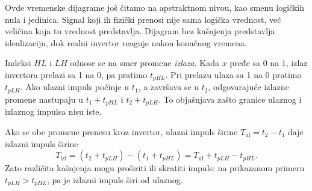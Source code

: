 
Ovde vremenske dijagrame još čitamo na apstraktnom nivou, kao smenu logičkih nula i jedinica. Signal koji ih fizički prenosi nije sama logička vrednost, već veličina koja tu vrednost predstavlja. Dijagram bez kašnjenja predstavlja idealizaciju, dok realni invertor reaguje nakon konačnog vremena.

Indeksi \(HL\) i \(LH\) odnose se na smer promene \emph{izlaza}. Kada \(x\) pređe sa 0 na 1, izlaz invertora prelazi sa 1 na 0, pa pratimo \(t_{pHL}\). Pri prelazu ulaza sa 1 na 0 pratimo \(t_{pLH}\). Ako ulazni impuls počinje u \(t_1\), a završava se u \(t_2\), odgovarajuće izlazne promene nastupaju u \(t_1+t_{pHL}\) i \(t_2+t_{pLH}\). To objašnjava zašto granice ulaznog i izlaznog impulsa nisu iste.

Ako se obe promene prenesu kroz invertor, ulazni impuls širine \(T_{\mathrm{ul}}=t_2-t_1\) daje izlazni impuls širine
\[
T_{\mathrm{izl}}=(t_2+t_{pLH})-(t_1+t_{pHL})
=T_{\mathrm{ul}}+t_{pLH}-t_{pHL}.
\]
Zato različita kašnjenja mogu proširiti ili skratiti impuls: na prikazanom primeru \(t_{pLH}>t_{pHL}\), pa je izlazni impuls širi od ulaznog.
